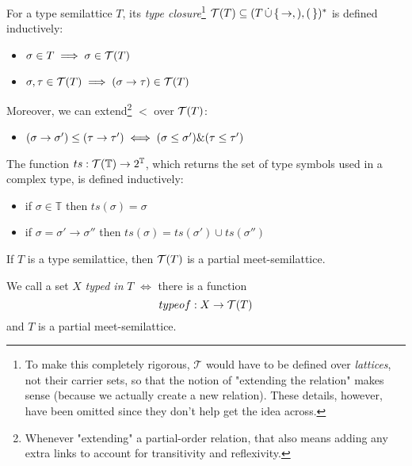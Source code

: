 \documentclass[main.tex]{subfiles}
\begin{document}
\begin{defn}
    For a type semilattice $T$, its \emph{type closure}\footnote{
        To make this completely rigorous, $\mathcal{T}$ would have to be defined
        over \emph{lattices}, not their carrier sets, so that the notion of
        "extending the relation" makes sense (because we actually create a
        new relation). These details, however, have been omitted since they don't
        help get the idea across.
    }
    $\mathcal{T}( T ) \subseteq (T \, \dot\cup \,\{\, \rightarrow, ), ( \,\})^*$ is defined
    inductively:

    \begin{itemize}
        \item $\sigma \in T \implies \sigma \in \mathcal{T}( T )$
        \item $\sigma, \tau \in \mathcal{T}( T ) \implies (\sigma \rightarrow \tau) \in \mathcal{T}( T )$
    \end{itemize}

    Moreover, we can extend\footnote{Whenever "extending" a partial-order relation,
        that also means adding any extra links to account for transitivity and
        reflexivity.} $\less$ over
    $\mathcal{T}( T )$:
    \begin{itemize}
        \item $(\sigma \rightarrow \sigma') \leq (\tau \rightarrow \tau') \iff (\sigma \leq \sigma')
            \& (\tau \leq \tau')$
    \end{itemize}
\end{defn}

\begin{defn}
    The function $ts : \mathcal{T}( \mathbb{T} ) \rightarrow 2^\mathbb{T}$, which
    returns the set of type symbols used in a complex type, is defined inductively:

    \begin{itemize}
        \item if $\sigma \in \mathbb{T}$ then $ts(\sigma) = \sigma$
        \item if $\sigma = \sigma' \rightarrow \sigma''$ then
            $ts(\sigma) = ts(\sigma') \cup ts(\sigma'')$
    \end{itemize}
\end{defn}

\begin{prop}
    If $T$ is a type semilattice, then $\mathcal{T}( T )$ is a partial meet-semilattice.
\end{prop}

\begin{defn}
    We call a set $X$ \emph{typed in} $T$ $\iff$ there is a function
    \[ typeof : X \rightarrow \mathcal{T}( T ) \] and $T$ is a partial meet-semilattice.
\end{defn}
\end{document}
